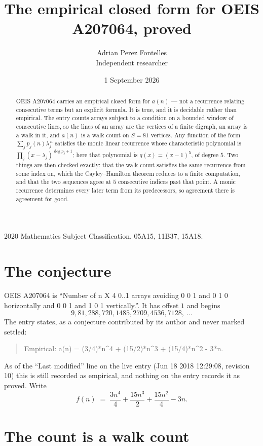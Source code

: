 \documentclass[11pt,a4paper]{article}
\title{The empirical closed form for OEIS A207064, proved}
\author{Adrian Perez Fontelles\\ \small Independent researcher}
\date{1 September 2026}
\theoremstyle{plain}
\theoremstyle{definition}
\begin{document}
\maketitle

\begin{abstract}
OEIS A207064 carries an empirical closed form for $a(n)$ --- not a recurrence relating
consecutive terms but an explicit formula. It is true, and it is decidable rather than
empirical. The entry counts arrays subject to a condition on a bounded window of consecutive lines, so the lines of an array are the
vertices of a finite digraph, an array is a walk in it, and $a(n)$ is a walk count on
$S=81$ vertices. Any function of the form $\sum_j p_j(n)\lambda_j^{\,n}$ satisfies the
monic linear recurrence whose characteristic polynomial is
$\prod_j(x-\lambda_j)^{\deg p_j+1}$; here that polynomial is $q(x)=(x-1)^{5}$, of degree
$5$. Two things are then checked exactly: that the walk count satisfies the same
recurrence from some index on, which the Cayley--Hamilton theorem reduces to a finite
computation, and that the two sequences agree at $5$ consecutive indices past that
point. A monic recurrence determines every later term from its predecessors, so agreement
there is agreement for good.
\end{abstract}

\noindent\small 2020 Mathematics Subject Classification. 05A15, 11B37, 15A18.\normalsize

\section{The conjecture}

OEIS A207064 is ``Number of n X 4 0..1 arrays avoiding 0 0 1 and 0 1 0 horizontally and 0 0 1 and 1 0 1 vertically.''. It has offset $1$ and begins
\[
9, 81, 288, 720, 1485, 2709, 4536, 7128,\ \dots
\]
The entry states, as a conjecture contributed by its author and never marked settled:
\begin{quote}
Empirical: a(n) = (3/4)*n\^{}4 + (15/2)*n\^{}3 + (15/4)*n\^{}2 - 3*n.
\end{quote}
As of the ``Last modified'' line on the live entry (Jun 18 2018 12:29:08, revision 10) this is still
recorded as empirical, and nothing on the entry records it as proved. Write
\[
f(n)\;=\;\frac{3 n^{4}}{4} + \frac{15 n^{3}}{2} + \frac{15 n^{2}}{4} - 3 n.
\]

\section{The count is a walk count}
\end{document}
